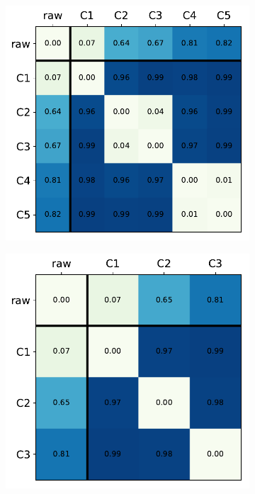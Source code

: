 \documentclass{article}
\begin{document}
\begin{figure}
  \begin{subfigure}{0.5\textwidth}
    \centering
    \includegraphics[scale=0.33]{figures/fig2b}
    \caption{}
    \label{fig:f2b}
  \end{subfigure}%
  \begin{subfigure}{.5\textwidth}
    \centering
    \includegraphics[scale=0.33]{figures/fig1b}
    \caption{}
    \label{fig:f1b}
  \end{subfigure}  


\end{figure}
\end{document}
